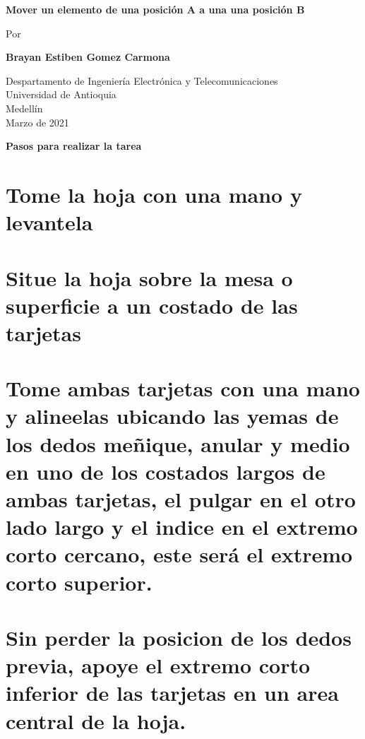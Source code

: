 \documentclass{article}
\begin{document}
\begin{titlepage}
    \begin{center}
        \vspace*{1cm}
            
        \Huge
        \textbf{Mover un elemento de una posición A a una una posición B}
            
        \vspace{0.5cm}
        \LARGE
        Por
            
        \vspace{1.5cm}
            
        \textbf{Brayan Estiben Gomez Carmona}
            
        \vfill
            
        \vspace{0.8cm}
            
        \Large
        Despartamento de Ingeniería Electrónica y Telecomunicaciones\\
        Universidad de Antioquia\\
        Medellín\\
        Marzo de 2021
            
    \end{center}
\end{titlepage}
\newpage

            
   \Huge
        \textbf{Pasos para realizar la tarea}
 \section{Tome la hoja con una mano y levantela}
\section{Situe la hoja sobre la mesa o superficie a un costado de las tarjetas}
\section{Tome ambas tarjetas con una mano y alineelas ubicando las yemas de los dedos meñique, anular y medio en uno de los costados largos de ambas tarjetas, el pulgar en el otro lado largo y el indice en el extremo corto cercano, este será el extremo corto superior.}
\section{Sin perder la posicion de los dedos previa, apoye el extremo corto inferior de las tarjetas en un area central de la hoja.}
\end{document}
